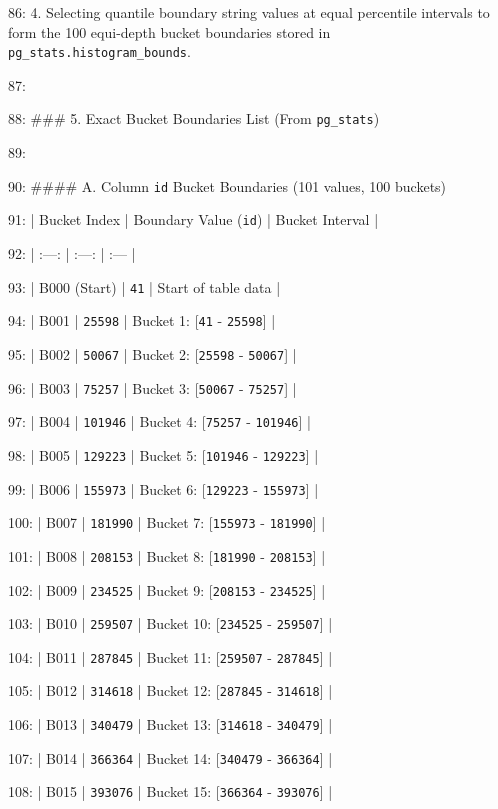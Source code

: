 \documentclass[11pt,a4paper]{article}
\begin{document}
{86: 4. Selecting quantile boundary string values at equal percentile intervals to form the 100 equi-depth bucket boundaries stored in \texttt{pg\_stats.histogram\_bounds}.

87:

88: \#\#\# 5. Exact Bucket Boundaries List (From \texttt{pg\_stats})

89:

90: \#\#\#\# A. Column \texttt{id} Bucket Boundaries (101 values, 100 buckets)

91: | Bucket Index | Boundary Value (\texttt{id}) | Bucket Interval |

92: | :---: | :---: | :--- |

93: | B000 (Start) | \texttt{41} | Start of table data |

94: | B001 | \texttt{25598} | Bucket 1: [\texttt{41} - \texttt{25598}] |

95: | B002 | \texttt{50067} | Bucket 2: [\texttt{25598} - \texttt{50067}] |

96: | B003 | \texttt{75257} | Bucket 3: [\texttt{50067} - \texttt{75257}] |

97: | B004 | \texttt{101946} | Bucket 4: [\texttt{75257} - \texttt{101946}] |

98: | B005 | \texttt{129223} | Bucket 5: [\texttt{101946} - \texttt{129223}] |

99: | B006 | \texttt{155973} | Bucket 6: [\texttt{129223} - \texttt{155973}] |

100: | B007 | \texttt{181990} | Bucket 7: [\texttt{155973} - \texttt{181990}] |

101: | B008 | \texttt{208153} | Bucket 8: [\texttt{181990} - \texttt{208153}] |

102: | B009 | \texttt{234525} | Bucket 9: [\texttt{208153} - \texttt{234525}] |

103: | B010 | \texttt{259507} | Bucket 10: [\texttt{234525} - \texttt{259507}] |

104: | B011 | \texttt{287845} | Bucket 11: [\texttt{259507} - \texttt{287845}] |

105: | B012 | \texttt{314618} | Bucket 12: [\texttt{287845} - \texttt{314618}] |

106: | B013 | \texttt{340479} | Bucket 13: [\texttt{314618} - \texttt{340479}] |

107: | B014 | \texttt{366364} | Bucket 14: [\texttt{340479} - \texttt{366364}] |

108: | B015 | \texttt{393076} | Bucket 15: [\texttt{366364} - \texttt{393076}] |

}
\end{document}
